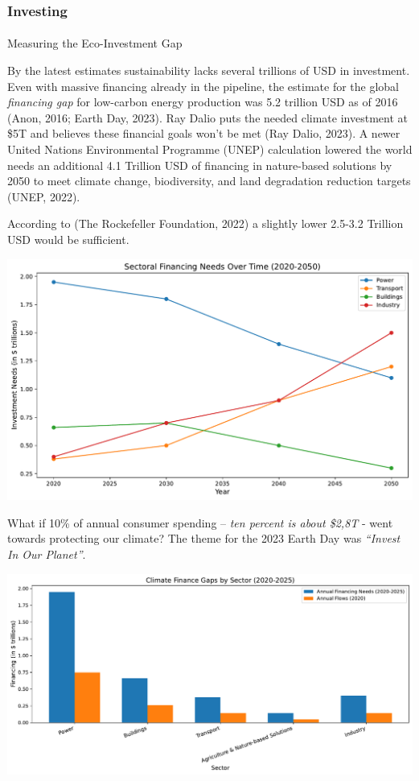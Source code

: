 \documentclass[
  letterpaper,
  DIV=11,
  numbers=noendperiod]{scrartcl}
\makeatletter
\let\oldparagraph\paragraph
\renewcommand{\paragraph}{
    \@ifstar
      \xxxParagraphStar
      \xxxParagraphNoStar
  }
\newcommand{\xxxParagraphStar}[1]{\oldparagraph*{#1}\mbox{}}
\newcommand{\xxxParagraphNoStar}[1]{\oldparagraph{#1}\mbox{}}
\makeatother
\begin{document}
\subsubsection{Investing}\label{investing}

\paragraph{Measuring the Eco-Investment
Gap}\label{measuring-the-eco-investment-gap}

By the latest estimates sustainability lacks several trillions of USD in
investment. Even with massive financing already in the pipeline, the
estimate for the global \emph{financing gap} for low-carbon energy
production was 5.2 trillion USD as of 2016 (Anon, 2016; Earth Day,
2023). Ray Dalio puts the needed climate investment at \$5T and believes
these financial goals won't be met (Ray Dalio, 2023). A newer United
Nations Environmental Programme (UNEP) calculation lowered the world
needs an additional 4.1 Trillion USD of financing in nature-based
solutions by 2050 to meet climate change, biodiversity, and land
degradation reduction targets (UNEP, 2022).

According to (The Rockefeller Foundation, 2022) a slightly lower 2.5-3.2
Trillion USD would be sufficient.

\includegraphics{_thesis_files/figure-pdf/cell-38-output-1.pdf}

What if 10\% of annual consumer spending -- \emph{ten percent is about
\$2,8T} - went towards protecting our climate? The theme for the 2023
Earth Day was \emph{``Invest In Our Planet''}.

\includegraphics{_thesis_files/figure-pdf/cell-39-output-1.pdf}
\end{document}
